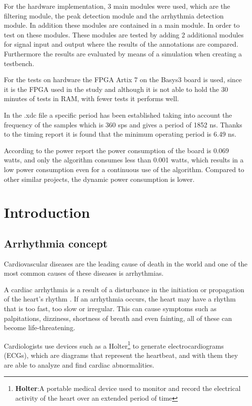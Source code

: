 For the hardware implementation, 3 main modules were used, which are the filtering module, the peak detection module and the arrhythmia detection module. In addition these modules are contained in a main module. In order to test on these modules. These modules are tested by adding 2 additional modules for signal input and output where the results of the annotations are compared. Furthermore the results are evaluated by means of a simulation when creating a testbench.

For the tests on hardware the FPGA Artix 7 on the Basys3 board is used, since it is the FPGA used in the study and although it is not able to hold the 30 minutes of tests in RAM, with fewer tests it performs well.

In the .xdc file a specific period has been established taking into account the frequency of the samples which is 360 sps and gives a period of 1852 ns. Thanks to the timing report it is found that the minimum operating period is 6.49 ns.

According to the power report the power consumption of the board is 0.069 watts, and only the algorithm consumes less than 0.001 watts, which results in a low power consumption even for a continuous use of the algorithm. Compared to other similar projects, the dynamic power consumption is lower.

\chapter*{Introduction}
\section*{Arrhythmia concept}
Cardiovascular diseases are the leading cause of death in the world \cite{roth2020global} and one of the most common causes of these diseases is arrhythmias.

A cardiac arrhythmia is a result of a disturbance in the initiation or propagation of the heart's rhythm \cite{velez}. If an arrhythmia occurs, the heart may have a rhythm that is too fast, too slow or irregular. This can cause symptoms such as palpitations, dizziness, shortness of breath and even fainting, all of these can become life-threatening.

Cardiologists use devices such as a Holter\footnote{\textbf{Holter}:A portable medical device used to monitor and record the electrical activity of the heart over an extended period of time} to generate electrocardiograms (ECGs), which are diagrams that represent the heartbeat, and with them they are able to analyze and find cardiac abnormalities.

